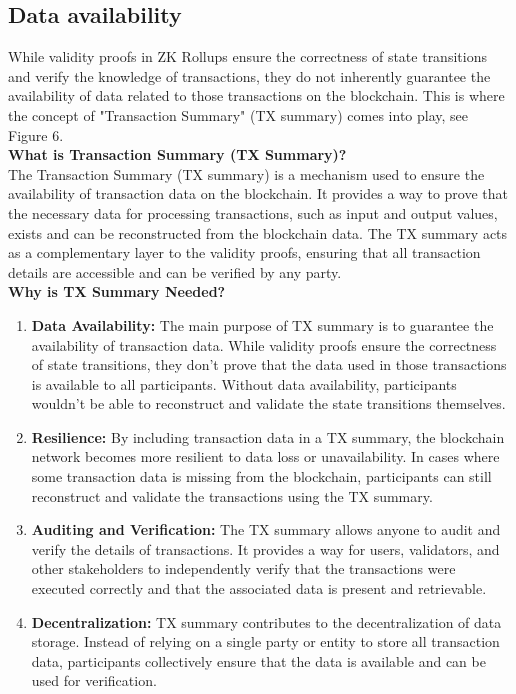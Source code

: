 \subsection{Data availability}
While validity proofs in ZK Rollups ensure the correctness of state transitions and verify the knowledge of transactions, they do not inherently guarantee the availability of data related to those transactions on the blockchain. This is where the concept of "Transaction Summary" (TX summary) comes into play, see Figure 6.\\
\textbf{What is Transaction Summary (TX Summary)?}\\
The Transaction Summary (TX summary) is a mechanism used to ensure the availability of transaction data on the blockchain. It provides a way to prove that the necessary data for processing transactions, such as input and output values, exists and can be reconstructed from the blockchain data. The TX summary acts as a complementary layer to the validity proofs, ensuring that all transaction details are accessible and can be verified by any party.\\
\textbf{Why is TX Summary Needed?}
\begin{enumerate}
	\item \textbf{Data Availability:}  The main purpose of TX summary is to guarantee the availability of transaction data. While validity proofs ensure the correctness of state transitions, they don't prove that the data used in those transactions is available to all participants. Without data availability, participants wouldn't be able to reconstruct and validate the state transitions themselves.
	\item \textbf{Resilience:} By including transaction data in a TX summary, the blockchain network becomes more resilient to data loss or unavailability. In cases where some transaction data is missing from the blockchain, participants can still reconstruct and validate the transactions using the TX summary.
	\item \textbf{Auditing and Verification:} The TX summary allows anyone to audit and verify the details of transactions. It provides a way for users, validators, and other stakeholders to independently verify that the transactions were executed correctly and that the associated data is present and retrievable.
	\item \textbf{Decentralization:} TX summary contributes to the decentralization of data storage. Instead of relying on a single party or entity to store all transaction data, participants collectively ensure that the data is available and can be used for verification.
\end{enumerate}
